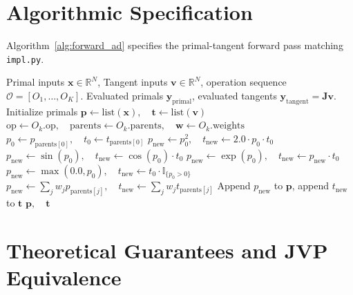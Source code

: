 \documentclass[11pt]{article}
\begin{document}
\section{Algorithmic Specification}
\label{sec:algorithm}

Algorithm~\ref{alg:forward_ad} specifies the primal-tangent forward pass matching \texttt{impl.py}.

\begin{algorithm}[H]
\caption{Forward-Mode Differentiation and Jacobian-Vector Product Evaluation}
\label{alg:forward_ad}
\begin{algorithmic}[1]
\Require Primal inputs $\mathbf{x} \in \mathbb{R}^N$, Tangent inputs $\mathbf{v} \in \mathbb{R}^N$, operation sequence $\mathcal{O} = [O_1, \dots, O_K]$.
\Ensure Evaluated primals $\mathbf{y}_{\mathrm{primal}}$, evaluated tangents $\mathbf{y}_{\mathrm{tangent}} = \mathbf{J}\mathbf{v}$.
\State Initialize primals $\mathbf{p} \gets \text{list}(\mathbf{x}), \quad \mathbf{t} \gets \text{list}(\mathbf{v})$
    \State $\mathrm{op} \gets O_k.\mathrm{op}, \quad \mathrm{parents} \gets O_k.\mathrm{parents}, \quad \mathbf{w} \gets O_k.\mathrm{weights}$
    \State $p_0 \gets p_{\mathrm{parents}[0]}, \quad t_0 \gets t_{\mathrm{parents}[0]}$
        \State $p_{\mathrm{new}} \gets p_0^2, \quad t_{\mathrm{new}} \gets 2.0 \cdot p_0 \cdot t_0$
        \State $p_{\mathrm{new}} \gets \sin(p_0), \quad t_{\mathrm{new}} \gets \cos(p_0) \cdot t_0$
        \State $p_{\mathrm{new}} \gets \exp(p_0), \quad t_{\mathrm{new}} \gets p_{\mathrm{new}} \cdot t_0$
        \State $p_{\mathrm{new}} \gets \max(0.0, p_0), \quad t_{\mathrm{new}} \gets t_0 \cdot \mathbb{I}_{\{p_0 > 0\}}$
        \State $p_{\mathrm{new}} \gets \sum_j w_j p_{\mathrm{parents}[j]}, \quad t_{\mathrm{new}} \gets \sum_j w_j t_{\mathrm{parents}[j]}$
    \EndIf
    \State Append $p_{\mathrm{new}}$ to $\mathbf{p}$, append $t_{\mathrm{new}}$ to $\mathbf{t}$
\EndFor
\State \Return $\mathbf{p}, \quad \mathbf{t}$
\end{algorithmic}
\end{algorithm}

\section{Theoretical Guarantees and JVP Equivalence}
\label{sec:guarantees}
\end{document}
